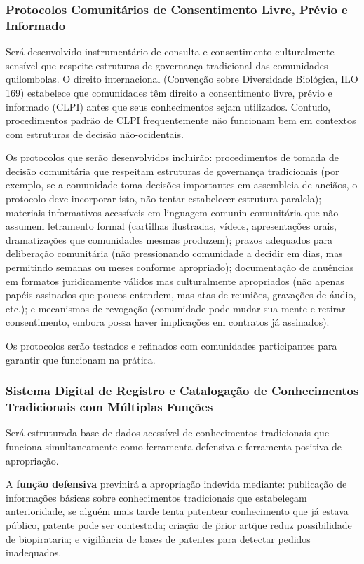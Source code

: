 \subsubsection{Protocolos Comunitários de Consentimento Livre, Prévio e Informado}

Será desenvolvido instrumentário de consulta e consentimento culturalmente sensível que respeite estruturas de governança tradicional das comunidades quilombolas. O direito internacional (Convenção sobre Diversidade Biológica, ILO 169) estabelece que comunidades têm direito a consentimento livre, prévio e informado (CLPI) antes que seus conhecimentos sejam utilizados. Contudo, procedimentos padrão de CLPI frequentemente não funcionam bem em contextos com estruturas de decisão não-ocidentais.

Os protocolos que serão desenvolvidos incluirão: procedimentos de tomada de decisão comunitária que respeitam estruturas de governança tradicionais (por exemplo, se a comunidade toma decisões importantes em assembleia de anciãos, o protocolo deve incorporar isto, não tentar estabelecer estrutura paralela); materiais informativos acessíveis em linguagem comunin comunitária que não assumem letramento formal (cartilhas ilustradas, vídeos, apresentações orais, dramatizações que comunidades mesmas produzem); prazos adequados para deliberação comunitária (não pressionando comunidade a decidir em dias, mas permitindo semanas ou meses conforme apropriado); documentação de anuências em formatos juridicamente válidos mas culturalmente apropriados (não apenas papéis assinados que poucos entendem, mas atas de reuniões, gravações de áudio, etc.); e mecanismos de revogação (comunidade pode mudar sua mente e retirar consentimento, embora possa haver implicações em contratos já assinados).

Os protocolos serão testados e refinados com comunidades participantes para garantir que funcionam na prática.

\subsubsection{Sistema Digital de Registro e Catalogação de Conhecimentos Tradicionais com Múltiplas Funções}

Será estruturada base de dados acessível de conhecimentos tradicionais que funciona simultaneamente como ferramenta defensiva e ferramenta positiva de apropriação.

A \textbf{função defensiva} previnirá a apropriação indevida mediante: publicação de informações básicas sobre conhecimentos tradicionais que estabeleçam anterioridade, se alguém mais tarde tenta patentear conhecimento que já estava público, patente pode ser contestada; criação de \"prior art\" que reduz possibilidade de biopirataria; e vigilância de bases de patentes para detectar pedidos inadequados.

